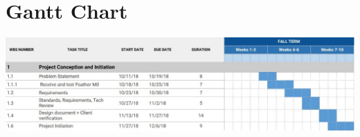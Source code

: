\documentclass[letterpaper,10pt,draftclsnofoot,onecolumn]{article}
\begin{document}
\section{Gantt Chart}


\includegraphics[scale=0.55]{GanttChart.eps}
\newline




\end{document}
